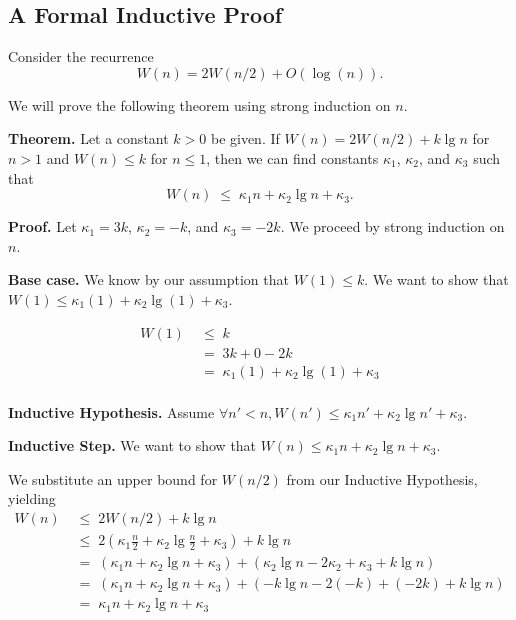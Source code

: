 \subsection{A Formal Inductive Proof}

\begin{example}
Consider the recurrence
  $$W(n) = 2 W(n/2) + O(\log(n)).$$

We will prove the following theorem using strong induction on $n$.

\textbf{Theorem.}
Let a constant $k > 0$ be given.  If $W(n) = 2 W(n/2) + k \lg n$ for $n >
1$ and $W(n) \leq k$ for $n \leq 1$, then we can find constants $\kappa_1$,
$\kappa_2$, and $\kappa_3$ such that \[ W(n) \;\leq\; \kappa_1 n + \kappa_2 \lg n + \kappa_3.\]

\textbf{Proof.} Let $\kappa_1 = 3k$, $\kappa_2 = -k$, and $\kappa_3 = -2k$.
We proceed by strong induction on $n$.

\textbf{Base case.} We know by our assumption that $W(1) \leq k$.
We want to show that $W(1) \leq \kappa_1 (1) + \kappa_2 \lg (1) + \kappa_3$.

\begin{align*}
W(1) \;& \leq \; k\\
      \;& = \; 3k + 0 - 2k\\
      \;& = \; \kappa_1 (1) + \kappa_2 \lg (1) + \kappa_3\\
\end{align*}

\textbf{Inductive Hypothesis.}
Assume $\forall n' < n, W(n') \leq \kappa_1 n' + \kappa_2 \lg n' + \kappa_3$.

\textbf{Inductive Step.} We want to show that $W(n) \leq \kappa_1 n + \kappa_2 \lg n + \kappa_3$.

We substitute an upper bound for $W(n/2)$ from our Inductive Hypothesis, yielding
\begin{align*}
W(n) \;& \leq \; 2 W(n/2) + k\lg n\\
     \;& \leq \; 2 \left(\kappa_1 \frac{n}{2} + \kappa_2 \lg \frac{n}{2} + \kappa_3 \right) + k \lg n\\
     \;& = \; \left(\kappa_1 n + \kappa_2 \lg n + \kappa_3 \right) + \left(\kappa_2 \lg n - 2 \kappa_2 + \kappa_3 + k \lg n \right) \\
     \;& = \; \left(\kappa_1 n + \kappa_2 \lg n + \kappa_3 \right) + \left(-k \lg n - 2 (-k) + (-2k) + k \lg n \right) \\
     \;& = \; \kappa_1 n + \kappa_2 \lg n + \kappa_3
\end{align*}
\end{example}

